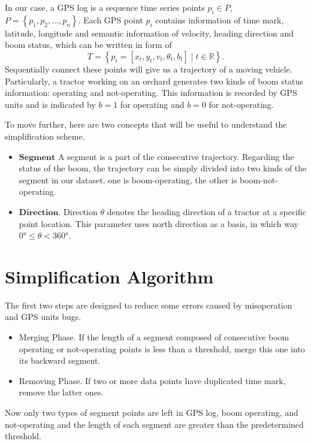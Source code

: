 In our case, a GPS log is a sequence time series points $p_i \in P$, $P=\left\lbrace p_1,p_2, \ldots, p_n \right\rbrace$. Each GPS point $p_i$ contains information of time mark, latitude, longitude and semantic information of velocity, heading direction and boom status, which can be written in form of
\begin{equation}
T=\left\lbrace p_t=[x_t,y_t,v_t,\theta_t,b_t] \mid t \in \mathbb{R} \right\rbrace.
\end{equation}
Sequentially connect these points will give us a trajectory of a moving vehicle.
Particularly, a tractor working on an orchard generates two kinds of boom status information: operating and not-operating. This information is recorded by GPS units and is indicated by $b=1$ for operating and $b=0$ for not-operating.


To move further, here are two concepts that will be useful to understand the simplification scheme.
\begin{itemize}
\item $\mathbf{Segment}$ A segment is a part of the consecutive trajectory. Regarding the status of the boom, the trajectory can be simply divided into two kinds of the segment in our dataset, one is boom-operating, the other is boom-not-operating. 
\item $\mathbf{Direction}$. Direction $\theta$ denotes the heading direction of a tractor at a specific point location. This parameter uses north direction as a basis, in which way $\ang{0} \leq \theta < \ang{360}$.
\end{itemize}



\section{Simplification Algorithm}

The first two steps are designed to reduce some errors caused by misoperation and GPS units bugs.
\begin{itemize}\itemsep0em
\item Merging Phase. If the length of a segment composed of consecutive boom operating or not-operating points is less than a threshold, merge this one into its backward segment. 
\item Removing Phase. If two or more data points have duplicated time mark, remove the latter ones. 
\end{itemize}
Now only two types of segment points are left in GPS log, boom operating, and not-operating and the length of each segment are greater than the predetermined threshold.

